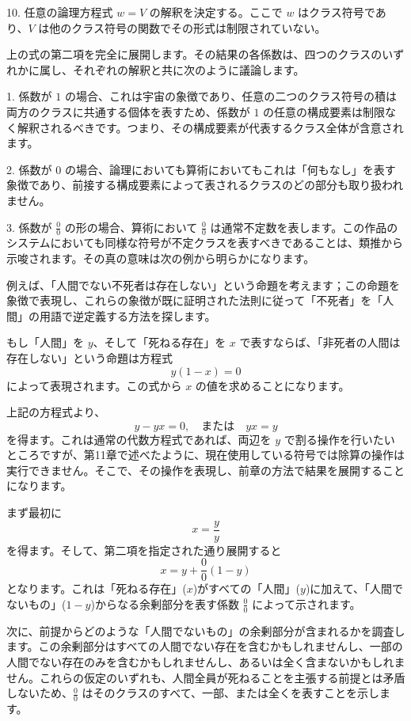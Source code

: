 \documentclass[a4paper,11pt,openany]{ltjsbook}
\begin{document}
10. 任意の論理方程式 \( w = V \) の解釈を決定する。ここで \( w \) はクラス符号であり、\( V \) は他のクラス符号の関数でその形式は制限されていない。

上の式の第二項を完全に展開します。その結果の各係数は、四つのクラスのいずれかに属し、それぞれの解釈と共に次のように議論します。

1. 係数が $1$ の場合、これは宇宙の象徴であり、任意の二つのクラス符号の積は両方のクラスに共通する個体を表すため、係数が $1$ の任意の構成要素は制限なく解釈されるべきです。つまり、その構成要素が代表するクラス全体が含意されます。

2. 係数が $0$ の場合、論理においても算術においてもこれは「何もなし」を表す象徴であり、前接する構成要素によって表されるクラスのどの部分も取り扱われません。

3. 係数が $\frac{0}{0}$ の形の場合、算術において $\frac{0}{0}$ は通常不定数を表します。この作品のシステムにおいても同様な符号が不定クラスを表すべきであることは、類推から示唆されます。その真の意味は次の例から明らかになります。

例えば、「人間でない不死者は存在しない」という命題を考えます；この命題を象徴で表現し、これらの象徴が既に証明された法則に従って「不死者」を「人間」の用語で逆定義する方法を探します。

もし「人間」を $y$、そして「死ねる存在」を $x$ で表すならば、「非死者の人間は存在しない」という命題は方程式
\[
y \left(1 - x\right) = 0
\]
によって表現されます。この式から $x$ の値を求めることになります。

上記の方程式より、
\[
y - yx = 0, \quad \text{または} \quad yx = y
\]
を得ます。これは通常の代数方程式であれば、両辺を $y$ で割る操作を行いたいところですが、第11章で述べたように、現在使用している符号では除算の操作は実行できません。そこで、その操作を表現し、前章の方法で結果を展開することになります。

まず最初に
\[
x = \frac{y}{y}
\]
を得ます。そして、第二項を指定された通り展開すると
\[
x = y + \frac{0}{0} (1 - y)
\]
となります。これは「死ねる存在」($x$)がすべての「人間」($y$)に加えて、「人間でないもの」($1 - y$)からなる余剰部分を表す係数 $\frac{0}{0}$ によって示されます。

次に、前提からどのような「人間でないもの」の余剰部分が含まれるかを調査します。この余剰部分はすべての人間でない存在を含むかもしれませんし、一部の人間でない存在のみを含むかもしれませんし、あるいは全く含まないかもしれません。これらの仮定のいずれも、人間全員が死ねることを主張する前提とは矛盾しないため、$\frac{0}{0}$ はそのクラスのすべて、一部、または全くを表すことを示します。
\end{document}
